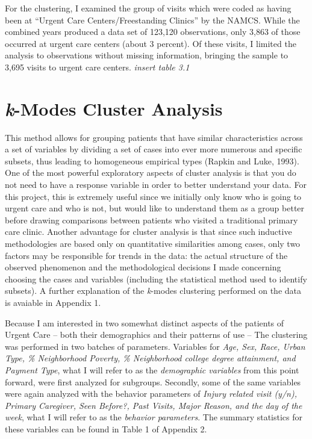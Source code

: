 \documentclass[12pt,twoside]{reedthesis}
\begin{document}
  For the clustering, I examined the group of visits which were coded as
  having been at ``Urgent Care Centers/Freestanding Clinics'' by the
  NAMCS. While the combined years produced a data set of 123,120
  observations, only 3,863 of those occurred at urgent care centers (about
  3 percent). Of these visits, I limited the analysis to observations
  without missing information, bringing the sample to 3,695 visits to
  urgent care centers. \emph{insert table 3.1}
  
  \section{\texorpdfstring{\emph{k}-Modes Cluster
  Analysis}{k-Modes Cluster Analysis}}\label{k-modes-cluster-analysis}
  
  This method allows for grouping patients that have similar
  characteristics across a set of variables by dividing a set of cases
  into ever more numerous and specific subsets, thus leading to
  homogeneous empirical types (Rapkin and Luke, 1993). One of the most
  powerful exploratory aspects of cluster analysis is that you do not need
  to have a response variable in order to better understand your data. For
  this project, this is extremely useful since we initially only know who
  is going to urgent care and who is not, but would like to understand
  them as a group better before drawing comparisons between patients who
  visited a traditional primary care clinic. Another advantage for cluster
  analysis is that since such inductive methodologies are based only on
  quantitative similarities among cases, only two factors may be
  responsible for trends in the data: the actual structure of the observed
  phenomenon and the methodological decisions I made concerning choosing
  the cases and variables (including the statistical method used to
  identify subsets). A further explanation of the \emph{k}-modes
  clustering performed on the data is avaiable in Appendix 1.
  
  Because I am interested in two somewhat distinct aspects of the patients
  of Urgent Care -- both their demographics and their patterns of use --
  The clustering was performed in two batches of parameters. Variables for
  \emph{Age, Sex, Race, Urban Type, \% Neighborhood Poverty, \%
  Neighborhood college degree attainment, and Payment Type}, what I will
  refer to as the \emph{demographic variables} from this point forward,
  were first analyzed for subgroups. Secondly, some of the same variables
  were again analyzed with the behavior parameters of \emph{Injury related
  visit (y/n), Primary Caregiver, Seen Before?, Past Visits, Major Reason,
  and the day of the week}, what I will refer to as the \emph{behavior
  parameters}. The summary statistics for these variables can be found in
  Table 1 of Appendix 2.
  
\end{document}
